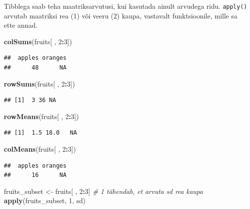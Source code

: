 \documentclass[]{book}
\newenvironment{Shaded}{\begin{snugshade}}{\end{snugshade}}
\newcommand{\KeywordTok}[1]{\textcolor[rgb]{0.13,0.29,0.53}{\textbf{#1}}}
\newcommand{\DecValTok}[1]{\textcolor[rgb]{0.00,0.00,0.81}{#1}}
\newcommand{\StringTok}[1]{\textcolor[rgb]{0.31,0.60,0.02}{#1}}
\newcommand{\CommentTok}[1]{\textcolor[rgb]{0.56,0.35,0.01}{\textit{#1}}}
\newcommand{\OperatorTok}[1]{\textcolor[rgb]{0.81,0.36,0.00}{\textbf{#1}}}
\newcommand{\NormalTok}[1]{#1}
\begin{document}
Tibblega saab teha maatriksarvutusi, kui kasutada ainult arvudega ridu.
\texttt{apply()} arvutab maatriksi rea (1) või veeru (2) kaupa,
vastavalt funktsioonile, mille sa ette annad.

\begin{Shaded}
\begin{Highlighting}[]
\KeywordTok{colSums}\NormalTok{(fruits[ , }\DecValTok{2}\OperatorTok{:}\DecValTok{3}\NormalTok{])}
\end{Highlighting}
\end{Shaded}

\begin{verbatim}
##  apples oranges 
##      48      NA
\end{verbatim}

\begin{Shaded}
\begin{Highlighting}[]
\KeywordTok{rowSums}\NormalTok{(fruits[ , }\DecValTok{2}\OperatorTok{:}\DecValTok{3}\NormalTok{])}
\end{Highlighting}
\end{Shaded}

\begin{verbatim}
## [1]  3 36 NA
\end{verbatim}

\begin{Shaded}
\begin{Highlighting}[]
\KeywordTok{rowMeans}\NormalTok{(fruits[ , }\DecValTok{2}\OperatorTok{:}\DecValTok{3}\NormalTok{])}
\end{Highlighting}
\end{Shaded}

\begin{verbatim}
## [1]  1.5 18.0   NA
\end{verbatim}

\begin{Shaded}
\begin{Highlighting}[]
\KeywordTok{colMeans}\NormalTok{(fruits[ , }\DecValTok{2}\OperatorTok{:}\DecValTok{3}\NormalTok{])}
\end{Highlighting}
\end{Shaded}

\begin{verbatim}
##  apples oranges 
##      16      NA
\end{verbatim}

\begin{Shaded}
\begin{Highlighting}[]
\NormalTok{fruits_subset <-}\StringTok{ }\NormalTok{fruits[ , }\DecValTok{2}\OperatorTok{:}\DecValTok{3}\NormalTok{]}
\CommentTok{# 1 tähendab, et arvuta sd rea kaupa}
\KeywordTok{apply}\NormalTok{(fruits_subset, }\DecValTok{1}\NormalTok{, sd)}
\end{Highlighting}
\end{Shaded}
\end{document}
